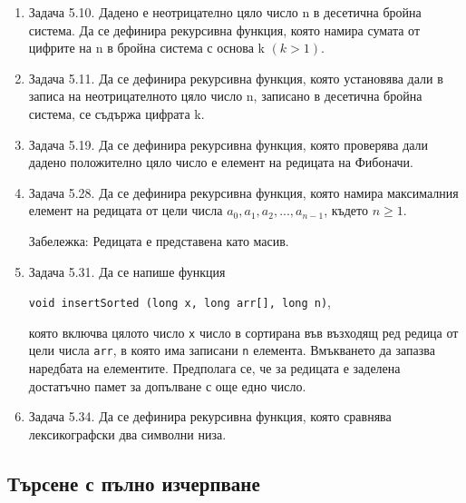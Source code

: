 {\begin{enumerate}
	\item Задача 5.10.\cite{sbornik} Дадено е неотрицателно цяло число n в десетична бройна система. Да се дефинира рекурсивна функция, която намира сумата от цифрите на n в бройна система с основа k $(k > 1)$.

	\item Задача 5.11.\cite{sbornik} Да се дефинира рекурсивна функция, която установява дали в записа на неотрицателното цяло число n, записано в десетична бройна система, се съдържа цифрата k.

	\item Задача 5.19.\cite{sbornik} Да се дефинира рекурсивна функция, която проверява дали дадено положително цяло число е елемент на редицата на Фибоначи.

	\item Задача 5.28.\cite{sbornik} Да се дефинира рекурсивна функция, която намира максималния елемент на редицата от цели числа $a_0, a_1, a_2, ..., a_{n-1}$, където $n \ge 1$.

	Забележка: Редицата е представена като масив.

	\item Задача 5.31.\cite{sbornik} Да се напише функция

	\texttt{void insertSorted (long x, long arr[], long n)},

	която включва цялото число \texttt{x} число в сортирана във възходящ ред редица от цели числа \texttt{arr}, в която има записани \texttt{n} елемента. Вмъкването да запазва наредбата на елементите. Предполага се, че за редицата е заделена достатъчно памет за допълване с още едно число.

	\item Задача 5.34.\cite{sbornik} Да се дефинира рекурсивна функция, която сравнява лексикографски два символни низа.
\end{enumerate}

\subsection{Търсене с пълно изчерпване}


}
